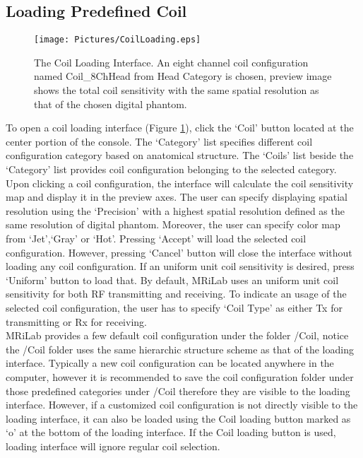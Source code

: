\documentclass{book}%
\begin{document}
\subsection{Loading Predefined Coil}

\begin{figure}[htbp]
	\centering
		\texttt{[image: Pictures/CoilLoading.eps]}
	\caption{The Coil Loading Interface. An eight channel coil configuration named Coil\_8ChHead from Head Category is chosen, preview image shows the total coil sensitivity with the same spatial resolution as that of the chosen digital phantom.}
	\label{fig:CoilLoading}
\end{figure}

To open a coil loading interface (Figure \ref{fig:CoilLoading}), click the `Coil' button located at the center portion of the console. The `Category' list specifies different coil configuration category based on anatomical structure. The `Coils' list beside the `Category' list provides coil configuration belonging to the selected category. Upon clicking a coil configuration, the interface will calculate the coil sensitivity map and display it in the preview axes. The user can specify displaying spatial resolution using the `Precision' with a highest spatial resolution defined as the same resolution of digital phantom. Moreover, the user can specify color map from `Jet',`Gray' or `Hot'. Pressing `Accept' will load the selected coil configuration. However, pressing `Cancel' button will close the interface without loading any coil configuration. If an uniform unit coil sensitivity is desired, press `Uniform' button to load that. By default, MRiLab uses an uniform unit coil sensitivity for both RF transmitting and receiving. To indicate an usage of the selected coil configuration, the user has to specify `Coil Type' as either Tx for transmitting or Rx for receiving. \\ 

MRiLab provides a few default coil configuration under the folder /Coil, notice the /Coil folder uses the same hierarchic structure scheme as that of the loading interface. Typically a new coil configuration can be located anywhere in the computer, however it is recommended to save the coil configuration folder under those predefined categories under /Coil therefore they are visible to the loading interface. However, if a customized coil configuration is not directly visible to the loading interface, it can also be loaded using the Coil loading button marked as `o' at the bottom of the loading interface. If the Coil loading button is used, loading interface will ignore regular coil selection.
\end{document}
